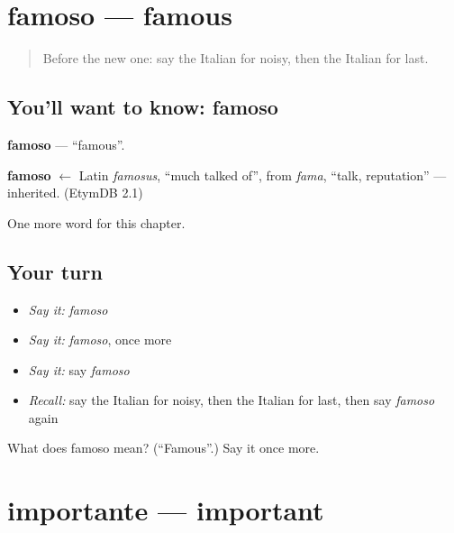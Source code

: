 \section[famoso]{famoso — famous}

\label{lesson:IT-C125-famoso}



\begin{quote}
Before the new one: say the Italian for noisy, then the Italian for last.
\end{quote}

\subsection*{You'll want to know: famoso}
\textbf{famoso} — \textquotedblleft{}famous\textquotedblright{}.

\begin{cousinweb}
\textbf{famoso} $\leftarrow$ Latin \emph{famosus}, \textquotedblleft{}much talked of\textquotedblright{}, from \emph{fama}, \textquotedblleft{}talk, reputation\textquotedblright{} — inherited. (EtymDB 2.1)
\end{cousinweb}

\begin{grammarlens}[title={What you've built}]
One more word for this chapter.
\end{grammarlens}

\subsection*{Your turn}
\begin{itemize}
\raggedright
  \item \emph{Say it:} \emph{famoso}
  \item \emph{Say it:} \emph{famoso}, once more
  \item \emph{Say it:} say \emph{famoso}
  \item \emph{Recall:} say the Italian for noisy, then the Italian for last, then say \emph{famoso} again
\end{itemize}

\begin{tcolorbox}[breakable,colback=teal!4,colframe=teal!35!black,title={Before you move on}]
What does famoso mean? (\textquotedblleft{}Famous\textquotedblright{}.) Say it once more.
\end{tcolorbox}
\section[importante]{importante — important}

